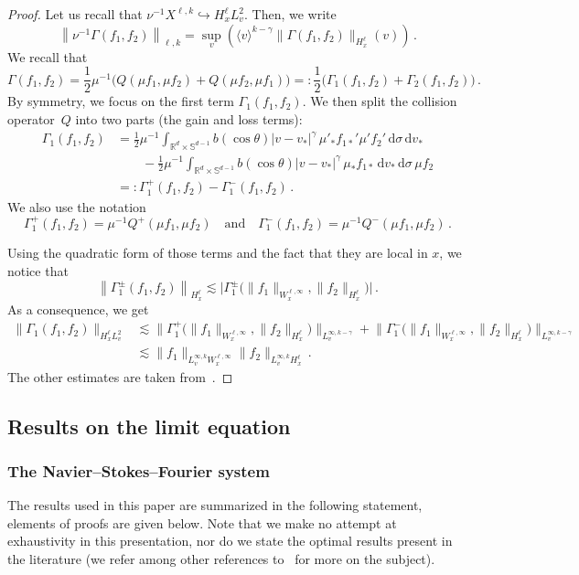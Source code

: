 \documentclass[11pt]{article}
\theoremstyle{definition}
\numberwithin{equation}{section}
\numberwithin{figure}{section}
\numberwithin{table}{section}
\newcommand*{\dd}{\mathrm{d}}
\newcommand*{\dv}{\dd v}
\newcommand*{\dsigma}{\dd \sigma}
\newcommand*\R {\mathbb{R}}
\newcommand*\Sp {\mathbb{S}}
\begin{document}
\begin{proof}
Let us recall that $ \nu^{-1} X^{\ell,k} \hookrightarrow H^\ell_xL^2_v$. Then, we write
\[
\left\| \nu^{-1} \Gamma(f_1,f_2)\right\|_{\ell,k} = \sup_v \left(\langle v \rangle^{k-\gamma} \|\Gamma(f_1,f_2)\|_{H^\ell_x} (v)\right) \,.
\]
We recall that
\[
\Gamma(f_1,f_2)= \frac12\mu^{-1}
\big(Q(\mu f_1,\mu f_2) + Q(\mu f_2,\mu f_1)\big)=: \frac12\Big(\Gamma_1(f_1,f_2) + \Gamma_2(f_1,f_2)\Big) \,.
\]
By symmetry, we focus on the first term $\Gamma_1(f_1,f_2)$. We then split the collision operator~$Q$ into two parts (the gain and loss terms):
\begin{align*}
\Gamma_1(f_1,f_2) &=\frac12 \mu^{-1}\int_{\R^d \times {\mathbb S}^{d-1}} b(\cos \theta) |v-v_*|^\gamma \, \mu'_*f_{1*}' \mu'f_2' \, \dsigma \, \dv_* \\
&\qquad- \frac12\mu^{-1} \int_{\R^d\times \Sp^{d-1}} b(\cos \theta) |v-v_*|^\gamma \, \mu_* f_{1*} \, \dv_* \, \dsigma\, \mu f_2 \\
&=: \Gamma_1^+(f_1,f_2) - \Gamma_1^-(f_1,f_2) \,.
\end{align*}
We also use the notation
\[
\Gamma_1^+ (f_1,f_2)= \mu^{-1} Q^+(\mu f_1,\mu f_2) \quad \text{and}\quad \Gamma_1^-(f_1,f_2) = \mu^{-1} Q^-(\mu f_1,\mu f_2)\,.
\]

Using the quadratic form of those terms and the fact that they are local in $x$, we notice that
\[
\left\|\Gamma_1^{\pm}(f_1,f_2)\right\|_{H^\ell_x} \lesssim \Big|\Gamma_1^{\pm}\big(\|f_1\|_{W^{\ell,\infty}_x}, \|f_2\|_{H^{\ell}_x}\big)\Big| \,.
\]
As a consequence, we get
\begin{align*}
\|\Gamma_1(f_1,f_2)\|_{H^\ell_xL^2_v} &\lesssim \big\|\Gamma_1^{+}\big(\|f_1\|_{W^{\ell,\infty}_x}, \|f_2\|_{H^{\ell}_x}\big)\big\|_{L^{\infty,k-\gamma}_v} + \big\|\Gamma_1^{-}\big(\|f_1\|_{W^{\ell,\infty}_x}, \|f_2\|_{H^{\ell}_x}\big)\big\|_{L^{\infty,k-\gamma}_v} \\
&\lesssim \|f_1\|_{L^{\infty,k}_v W^{\ell,\infty}_x} \|f_2\|_{L^{\infty,k}_v H^\ell_x} \,.
\end{align*}
The other estimates are taken from~\cite[Lemma~4.5.1]{Ukai}.
\end{proof}



\subsection{Results on the limit equation}\label{appendixNS}
\subsubsection{The Navier--Stokes--Fourier system}
The results used in this paper are summarized in the following statement, elements of proofs are given below. Note that we make no attempt at exhaustivity in this presentation, nor do we state the optimal results present in the literature (we refer among other references to~\cite{BCD,cheminSIAM,lemarie1,lemarie2} for more on the subject).
\end{document}
